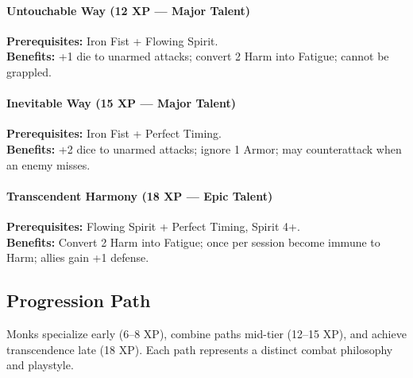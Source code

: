 \paragraph{Untouchable Way (12 XP --- Major Talent)} 
\textbf{Prerequisites:} Iron Fist + Flowing Spirit. \\
\textbf{Benefits:} +1 die to unarmed attacks; convert 2 Harm into Fatigue; cannot be grappled.

\paragraph{Inevitable Way (15 XP --- Major Talent)} 
\textbf{Prerequisites:} Iron Fist + Perfect Timing. \\
\textbf{Benefits:} +2 dice to unarmed attacks; ignore 1 Armor; may counterattack when an enemy misses.

\paragraph{Transcendent Harmony (18 XP --- Epic Talent)} 
\textbf{Prerequisites:} Flowing Spirit + Perfect Timing, Spirit 4+. \\
\textbf{Benefits:} Convert 2 Harm into Fatigue; once per session become immune to Harm; allies gain +1 defense.

\subsection*{Progression Path}
Monks specialize early (6--8 XP), combine paths mid-tier (12--15 XP), and achieve transcendence late (18 XP). Each path represents a distinct combat philosophy and playstyle.